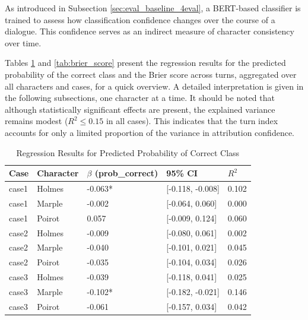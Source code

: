 \documentclass{article}
\begin{document}
As introduced in Subsection \ref{sec:eval_baseline_4eval}, a BERT-based classifier is trained to assess how classification confidence changes over the course of a dialogue. This confidence serves as an indirect measure of character consistency over time.

Tables \ref{tab:prob_correct} and \ref{tab:brier_score} present the regression results for the predicted probability of the correct class and the Brier score across turns, aggregated over all characters and cases, for a quick overview. A detailed interpretation is given in the following subsections, one character at a time. It should be noted that although statistically significant effects are present, the explained variance remains modest ($R^2\leq0.15$ in all cases). This indicates that the turn index accounts for only a limited proportion of the variance in attribution confidence.

\begin{table}[H]
\centering
\begin{tabular}{l l l l l}\toprule
\textbf{Case} & \textbf{Character} & \textbf{$\beta$ (prob\_correct)} \footnotemark[2]& \textbf{95\% CI} & \textbf{$R^2$}\\\midrule
case1 & Holmes & -0.063* & [-0.118, -0.008] & 0.102 \\
case1 & Marple & -0.002 & [-0.064, 0.060] & 0.000 \\
case1 & Poirot & 0.057 & [-0.009, 0.124] & 0.060 \\
case2 & Holmes & -0.009 & [-0.080, 0.061] & 0.002 \\
case2 & Marple & -0.040 & [-0.101, 0.021] & 0.045 \\
case2 & Poirot & -0.035 & [-0.104, 0.034] & 0.026 \\
case3 & Holmes & -0.039 & [-0.118, 0.041] & 0.025 \\
case3 & Marple & -0.102* & [-0.182, -0.021] & 0.146 \\
case3 & Poirot & -0.061 & [-0.157, 0.034] & 0.042 \\ \bottomrule
\end{tabular}
\caption{Regression Results for Predicted Probability of Correct Class}
\label{tab:prob_correct}
\end{table}
\end{document}
